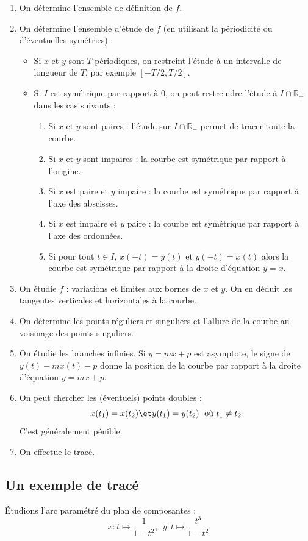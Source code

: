 \documentclass[a4paper,10pt]{report}
\begin{document}
\begin{enumerate}
\item On détermine l'ensemble de définition de $f$.
\item On détermine l'ensemble d'étude de $f$ (en utilisant la périodicité ou d'éventuelles symétries) :
\begin{itemize}
\item Si $x$ et $y$ sont $T$-périodiques, on restreint l'étude à un intervalle de longueur de $T$, par exemple $[-T/2,T/2]$.
\item Si $I$ est symétrique par rapport à $0$, on peut restreindre l'étude à $I \cap \mathbb{R}_+$ dans les cas suivants :
\begin{enumerate}
\item Si $x$ et $y$ sont paires : l'étude sur $I \cap \mathbb{R}_+$ permet de tracer toute la courbe.
\item Si $x$ et $y$ sont impaires : la courbe est symétrique par rapport à l'origine.
\item Si $x$ est paire et $y$ impaire : la courbe est symétrique par rapport à l'axe des abscisses.
\item Si $x$ est impaire et $y$ paire : la courbe est symétrique par rapport à l'axe des ordonnées.
\item Si pour tout $t \in I$, $x(-t)=y(t)$ et $y(-t)=x(t)$ alors la courbe est symétrique par rapport à la droite d'équation $y=x$.
\end{enumerate}
\end{itemize}
\item On étudie $f$ : variations et limites aux bornes de $x$ et $y$. On en déduit les tangentes verticales et horizontales à la courbe.
\item On détermine les points réguliers et singuliers et l'allure de la courbe au voisinage des points singuliers.
\item On étudie les branches infinies. Si $y=mx+p$ est asymptote, le signe de $y(t)-mx(t)-p$ donne la position de la courbe par rapport à la droite d'équation $y=mx+p$.
\item On peut chercher les (éventuels) points doubles :
$$ x(t_1)=x(t_2) \et y(t_1)=y(t_2) \; \hbox{ où } t_1 \neq t_2$$
C'est généralement pénible.
\item On effectue le tracé.
\end{enumerate}

\subsection{Un exemple de tracé}
\noindent Étudions l'arc paramétré du plan de composantes :
$$ x : t \mapsto \dfrac{1}{1-t^2}, \; \, y : t \mapsto \dfrac{t^3}{1-t^2}$$
\end{document}
